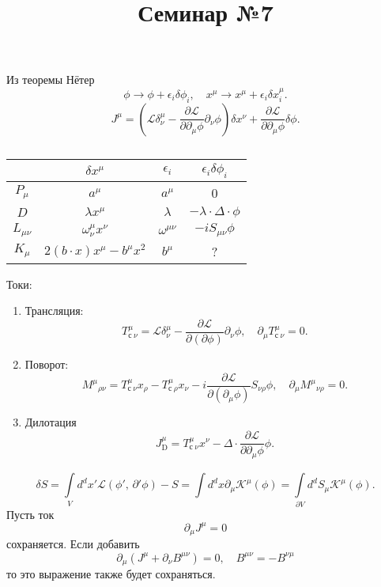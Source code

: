 \documentclass[a4paper]{article}
\title{Семинар №7}
\begin{document}
	\maketitle
	Из теоремы Нётер
	\[
	\phi \to  \phi + \epsilon_i \delta \phi_i,\quad
	x^\mu \to  x^\mu+ \epsilon_i \delta x_i^\mu
	.\] 
	\[
		J^\mu= \left( \mathcal{L} \delta_\nu^\mu -
		\frac{\partial \mathcal{L}}{\partial \partial_\mu \phi} \partial_\nu \phi\right) 
		\delta x^\nu+ \frac{\partial \mathcal{L}}{\partial \partial_\mu \phi} \delta \phi
	.\] 
	\begin{table}[htpb]
	\centering
	\caption{}
	\label{tab:1}
	\begin{tabular}{|c|c|c|c|}
		\hline  & $\delta x^\mu$ & $\epsilon_i$ & $\epsilon_i \delta \phi_i$ \\
		\hline $P_\mu$ & $a^\mu$ & $a^\mu$ & 0\\
		\hline $D$ & $\lambda x^\mu$ & $\lambda$ &
		$-\lambda \cdot \Delta \cdot \phi$\\
		\hline $L_{\mu \nu}$ & $\omega^\mu_\nu x^\nu$ & $\omega^{\mu\nu}$ & $-i S_{\mu\nu} \phi$\\
		\hline $K_\mu$ & $2(b\cdot x) x^\mu - b^\mu x^2$ & $b^\mu$ &  ?\\
		\hline
	\end{tabular}
	\end{table}

Токи:
\begin{enumerate}
\item Трансляция:
	\[
		T_\text{с}^\mu {}_\nu = \mathcal{L} \delta^\mu_\nu-
		\frac{\partial \mathcal{L}}{\partial (\partial \phi)} \partial_\nu \phi,\quad \partial_\mu T_\text{с}^\mu {}_\nu=0 
	.\] 
\item Поворот:
	\[
		M^\mu {}_{\rho \nu}=
		T_\text{с}^\mu {}_\nu x_\rho - T_\text{с}^\mu {}_\rho x_\nu-
		i \frac{\partial \mathcal{L}}{\partial \left( \partial
		_\mu \phi\right) } S_{\nu \rho}\phi,\quad
		\partial_\mu M^\mu {}_{\nu\rho}=0
	.\] 
\item Дилотация
	\[
		J_{\text{D}}^\mu= T_\text{с}^\mu {}_\nu x^\nu-
		\Delta \cdot \frac{\partial \mathcal{L}}{\partial \partial _\mu \phi} \phi
	.\] 
\end{enumerate}
\[
	\delta S = \int\limits_{V}^{} d^d x' \mathcal{L}
	\left( \phi' ,\,\partial ' \phi\right) -S
	= \int d^d x \partial_\mu \mathcal{K}^\mu (\phi)=
	\int\limits_{\partial V}^{} d^d  S_\mu \mathcal{K}^\mu(\phi) 
.\] 
Пусть ток
\[
\partial_\mu J^\mu=0
\]
сохраняется. Если добавить
\[
	\partial_\mu \left( J^\mu +\partial_\nu
	B^{\mu \nu}\right)=0,\quad B^{\mu\nu}=- B^{\nu \mu}
\]
то это выражение также будет сохраняться.
\end{document}
